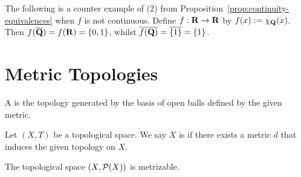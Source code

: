 \begin{example}
    The following is a counter example of (2) from Proposition~\ref{prop:continuity-equivalences} when $f$ is not continuous. Define $f:\mathbf{R} \rightarrow \mathbf{R}$ by $f(x) := \chi_{\mathbf{Q}}(x)$. Then $f(\overline{\mathbf{Q}}) = f(\mathbf{R}) = \{0,1\}$, whilst $\overline{f(\mathbf{Q})} = \overline{\{1\}} = \{1\}$.
\end{example}

\section{Metric Topologies}

\begin{definition}
    A  is the topology generated by the basis of open balls defined by the given metric.
\end{definition}

\begin{definition}
    Let $(X,T)$ be a topological space. We say $X$ is  if there exists a metric $d$ that induces the given topology on $X$.
\end{definition}

\begin{example}
    The topological space $(X,\mathcal{P}(X))$ is metrizable.

\end{example}

